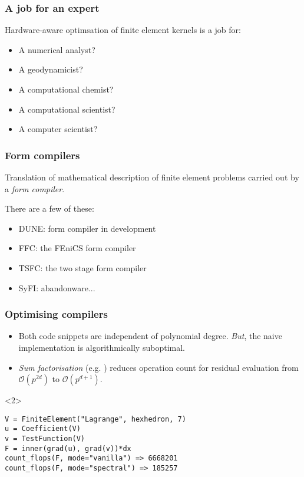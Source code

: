 \documentclass[presentation]{beamer}
\begin{document}
\begin{frame}
  \frametitle{A job for an expert}
  Hardware-aware optimsation of finite element kernels is a job for:
  \begin{itemize}
  \item<2-> A numerical analyst?
  \item<3-> A geodynamicist?
  \item<4-> A computational chemist?
  \item<5-> A computational scientist?
  \item<6-> A computer scientist?
  \end{itemize}
\end{frame}

\begin{frame}
  \frametitle{Form compilers}
  Translation of mathematical description of finite element problems
  carried out by a \emph{form compiler}.

  There are a few of these:

  \begin{itemize}
  \item DUNE: form compiler in development
  \item FFC: the FEniCS form compiler
  \item TSFC: the two stage form compiler
  \item SyFI: abandonware...
  \end{itemize}  
\end{frame}

\begin{frame}[fragile]
  \frametitle{Optimising compilers}
  \begin{itemize}
  \item Both code snippets are independent of polynomial degree.
    \emph{But}, the naive implementation is algorithmically
    suboptimal.

    \item \emph{Sum factorisation} (e.g. \textcite{Karniadakis:2005}) reduces
      operation count for residual evaluation from $\mathcal{O}(p^{2d})$
      to $\mathcal{O}(p^{d+1})$.
  \end{itemize}
  \begin{uncoverenv}<2>
    \begin{center}
\begin{verbatim}
V = FiniteElement("Lagrange", hexhedron, 7)
u = Coefficient(V)
v = TestFunction(V)
F = inner(grad(u), grad(v))*dx
count_flops(F, mode="vanilla") => 6668201
count_flops(F, mode="spectral") => 185257
\end{verbatim}
    \end{center}
  \end{uncoverenv}
\end{frame}
\end{document}
